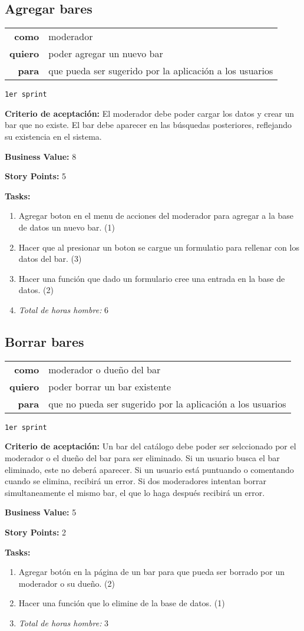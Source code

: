 \documentclass[hidelinks,a4paper,11pt, nofootinbib]{article}
\newcommand{\userstory}[3]{
\begin{tabular}{|r p{10cm}|}
  \hline
  \textbf{como} & #1 \\
  \textbf{quiero} & #2 \\
  \textbf{para} & #3 \\
  \hline
\end{tabular}

}
\newcommand{\critdeacep}[1]{\textbf{Criterio de aceptación:} #1

}
\newcommand{\busvalue}[1]{\textbf{Business Value:} #1

}
\newcommand{\storypoints}[1]{\textbf{Story Points:} #1

}
\newcommand{\primersprint}{\texttt{1er sprint}

}
\newcommand{\tasks}[1]{\textbf{Tasks:} 

#1}
\begin{document}
\subsection*{Agregar bares}
\userstory{moderador}{poder agregar un nuevo bar}{que pueda ser sugerido por la aplicación a los usuarios}
\primersprint
\critdeacep{El moderador debe poder cargar los datos y crear un bar que no existe. El bar debe aparecer en las búsquedas posteriores, reflejando su existencia en el sistema.}
\busvalue{8}
\storypoints{5}
\tasks{
  \begin{enumerate}
    \item Agregar boton en el menu de acciones del moderador para agregar a la base de datos un nuevo bar. (1)
    \item Hacer que al presionar un boton se cargue un formulatio para rellenar con los datos del bar. (3)
    \item Hacer una función que dado un formulario cree una entrada en la base de datos. (2)
    \item[] \textit{Total de horas hombre:} 6
  \end{enumerate}
}


\subsection*{Borrar bares}
\userstory{moderador o dueño del bar}{poder borrar un bar existente}{que no pueda ser sugerido por la aplicación a los usuarios}
\primersprint
\critdeacep{Un bar del catálogo debe poder ser selccionado por el moderador o el dueño del bar para ser eliminado. Si un usuario busca el bar eliminado, este no deberá aparecer. Si un usuario está puntuando o comentando cuando se elimina, recibirá un error. Si dos moderadores intentan borrar simultaneamente el mismo bar, el que lo haga después recibirá un error.}
\busvalue{5}
\storypoints{2}
\tasks{
  \begin{enumerate}
    \item Agregar botón en la página de un bar para que pueda ser borrado por un moderador o su dueño. (2)
    \item Hacer una función que lo elimine de la base de datos. (1)
    \item[] \textit{Total de horas hombre:} 3
  \end{enumerate}
}
\end{document}
